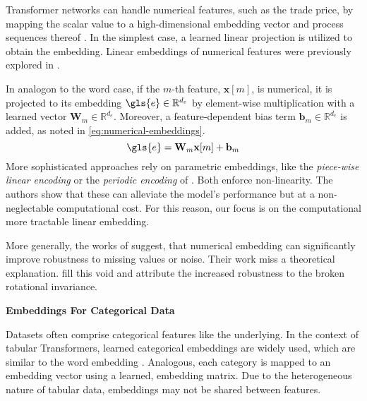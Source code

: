 Transformer networks can handle numerical features, such as the trade price, by mapping the scalar value to a high-dimensional embedding vector and process sequences thereof \autocite[][3]{gorishniyEmbeddingsNumericalFeatures2022}. In the simplest case, a learned linear projection is utilized to obtain the embedding. Linear embeddings of numerical features were previously explored in \textcites[][3]{kossenSelfAttentionDatapointsGoing2021}[][4]{somepalliSaintImprovedNeural2021}[][4]{gorishniyRevisitingDeepLearning2021}.

In analogon to the word case, if the $m$-th feature, $\mathbf{x}[m]$, is numerical, it is projected to its embedding $\gls{e} \in \mathbb{R}^{d_e}$ by element-wise multiplication with a learned vector $\mathbf{W}_m \in \mathbb{R}^{d_{e}}$. Moreover, a feature-dependent bias term $\mathbf{b}_m \in \mathbb{R}^{d_{e}}$ is added, as noted in \cref{eq:numerical-embeddings}.
\begin{equation}
    \gls{e}= \mathbf{W}_m \mathbf{x}[m] +\mathbf{b}_m
    \label{eq:numerical-embeddings}
\end{equation}
More sophisticated approaches rely on parametric embeddings, like the \emph{piece-wise linear encoding} or the \emph{periodic encoding} of \textcite[][10]{gorishniyEmbeddingsNumericalFeatures2022}. Both enforce non-linearity. The authors show that these can alleviate the model's performance but at a non-neglectable computational cost. For this reason, our focus is on the computational more tractable linear embedding.

More generally, the works of \textcites[][1]{gorishniyEmbeddingsNumericalFeatures2022}[][1]{somepalliSaintImprovedNeural2021} suggest, that numerical embedding can significantly improve robustness to missing values or noise. Their work miss a theoretical explanation. \textcite[][8--9]{grinsztajnWhyTreebasedModels2022} fill this void and attribute the increased robustness to the broken rotational invariance.

\textbf{Embeddings For Categorical Data}

Datasets often comprise categorical features like the underlying. In the context of tabular Transformers, learned categorical embeddings are widely used, which are similar to the word embedding 
\autocites[][4]{gorishniyRevisitingDeepLearning2021}[][2]{huangTabTransformerTabularData2020}[][4]{somepalliSaintImprovedNeural2021}. Analogous, each category is mapped to an embedding vector using a learned, embedding matrix. Due to the heterogeneous nature of tabular data, embeddings may not be shared between features.

